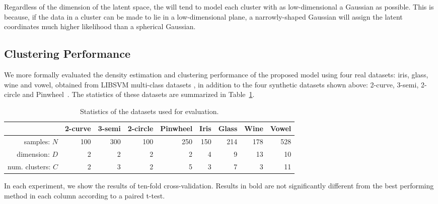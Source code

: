 Regardless of the dimension of the latent space, the \iwmm{} will tend to model each cluster with as low-dimensional a Gaussian as possible. 
This is because, if the data in a cluster can be made to lie in a low-dimensional plane, a narrowly-shaped Gaussian will assign the latent coordinates much higher likelihood than a spherical Gaussian.

\subsection{Clustering Performance}
We more formally evaluated the density estimation and clustering performance of the proposed model using four real datasets: iris, glass, wine and vowel, obtained from LIBSVM multi-class datasets \citep{chang2011libsvm}, in addition to the four synthetic datasets shown above: 2-curve, 3-semi, 2-circle and Pinwheel~\citep{adams2009archipelago}.
The statistics of these datasets are summarized in Table~\ref{tab:statistics}.
%
\begin{table}[ht!]
\centering
\caption[Datasets used for evaluation of the \siwmm{}]
{Statistics of the datasets used for evaluation.}
\label{tab:statistics}
\begin{tabular}{rrrrrrrrr}
\hline
 & 2-curve & 3-semi & 2-circle & Pinwheel & Iris  & Glass  & Wine  & Vowel  \\
\hline
samples: $N$ & 100 & 300 & 100 & 250 & 150 & 214 & 178 & 528 \\
dimension: $D$ & 2 & 2 & 2 & 2 & 4 & 9 & 13 & 10 \\
num. clusters: $C$ & 2 & 3 & 2 & 5 & 3 & 7 & 3 & 11 \\
\hline
\end{tabular}
\end{table}
%
In each experiment, we show the results of ten-fold cross-validation.
Results in bold are not significantly different from the best performing method in each column according to a paired t-test.
%
%

